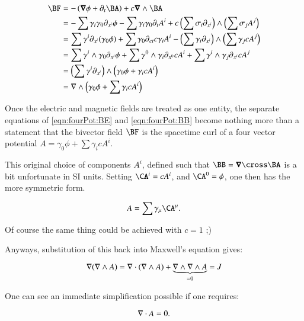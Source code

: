 \begin{align*}
\BF 
&= - \left( \spacegrad \phi + \partial_t \BA \right) + c \spacegrad \wedge \BA \\
&= - \sum \gamma_i \gamma_0 \partial_{x^i}\phi - \sum \gamma_i \gamma_0 \partial_t A^i 
+ c \left(\sum \sigma_i \partial_{x^i}\right) \wedge \left(\sum \sigma_j A^j\right) \\
&= \sum \gamma^i \partial_{x^i} (\gamma_0 \phi) + \sum \gamma_0 \partial_{ct} c \gamma_i A^i 
- \left(\sum \gamma_i \partial_{x^i}\right) \wedge \left(\sum \gamma_j c A^j\right) \\
&= \sum \gamma^i \wedge \gamma_0 \partial_{x^i} \phi + \sum \gamma^0 \wedge \gamma_i \partial_{x^0} c A^i 
+ \sum \gamma^i \wedge \gamma_j \partial_{x^i} c A^j \\
&= \left(\sum \gamma^i \partial_{x^i}\right) \wedge \left(\gamma_0 \phi + \gamma_i c A^i \right) \\
&= \grad \wedge \left(\gamma_0 \phi + \sum \gamma_i c A^i \right)
\end{align*}

Once the electric and magnetic fields are treated as one entity, the separate equations of 
\ref{eqn:fourPot:BE} and \ref{eqn:fourPot:BB} become nothing more than a statement that the bivector field $\BF$ is the spacetime curl
of a four vector potential $A = \gamma_0 \phi + \sum \gamma_i c A^i$.

This original choice of components $A^i$, defined such that $\BB = \spacegrad \cross \BA$ is a bit unfortunate in SI
units.  Setting $\CA^i = cA^i$, and $\CA^0 = \phi$, one then has the more symmetric form.

\begin{equation*}
A = \sum \gamma_{\mu} \CA^{\mu}.
\end{equation*}

Of course the same thing could be achieved with $c=1$ ;)

Anyways, substitution of this back into Maxwell's equation gives:

\begin{equation*}
\nabla (\nabla \wedge A) = \nabla \cdot (\nabla \wedge A) + \underbrace{\nabla \wedge \nabla \wedge A}_{=0} = J
\end{equation*}

One can see an immediate simplification possible if one requires:

\begin{equation*}
\nabla \cdot A = 0.
\end{equation*}

